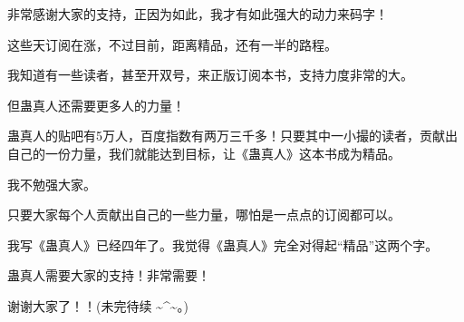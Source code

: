 \begin{this_body}
非常感谢大家的支持，正因为如此，我才有如此强大的动力来码字！

这些天订阅在涨，不过目前，距离精品，还有一半的路程。

我知道有一些读者，甚至开双号，来正版订阅本书，支持力度非常的大。

但蛊真人还需要更多人的力量！

蛊真人的贴吧有5万人，百度指数有两万三千多！只要其中一小撮的读者，贡献出自己的一份力量，我们就能达到目标，让《蛊真人》这本书成为精品。

我不勉强大家。

只要大家每个人贡献出自己的一些力量，哪怕是一点点的订阅都可以。

我写《蛊真人》已经四年了。我觉得《蛊真人》完全对得起“精品”这两个字。

蛊真人需要大家的支持！非常需要！

谢谢大家了！！(未完待续 \~{}\^{}\~{}。)

\end{this_body}

